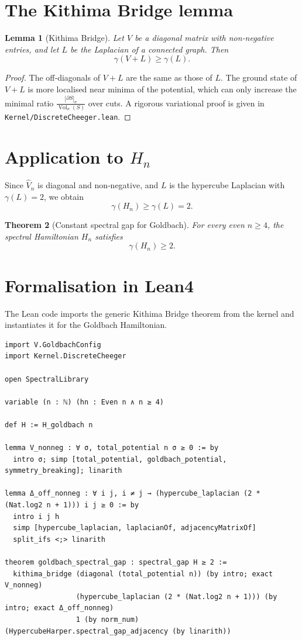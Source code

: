 \documentclass[11pt,a4paper]{article}
\newtheorem{theorem}{Theorem}[section]
\newtheorem{lemma}[theorem]{Lemma}
\begin{document}
\section{The Kithima Bridge lemma}

\begin{lemma}[Kithima Bridge]
Let \(V\) be a diagonal matrix with non‑negative entries, and let \(L\) be the Laplacian of a connected graph. Then
\[
\gamma(V + L) \ge \gamma(L).
\]
\end{lemma}
\begin{proof}
The off‑diagonals of \(V+L\) are the same as those of \(L\). The ground state of \(V+L\) is more localised near minima of the potential, which can only increase the minimal ratio \(\frac{|\partial S|_\sigma}{\operatorname{Vol}_\sigma(S)}\) over cuts. A rigorous variational proof is given in \texttt{Kernel/DiscreteCheeger.lean}.
\end{proof}

\section{Application to \(H_n\)}

Since \(\hat{V}_n\) is diagonal and non‑negative, and \(L\) is the hypercube Laplacian with \(\gamma(L)=2\), we obtain
\[
\gamma(H_n) \ge \gamma(L) = 2.
\]

\begin{theorem}[Constant spectral gap for Goldbach]
For every even \(n \ge 4\), the spectral Hamiltonian \(H_n\) satisfies
\[
\gamma(H_n) \ge 2.
\]
\end{theorem}

\section{Formalisation in Lean4}

The Lean code imports the generic Kithima Bridge theorem from the kernel and instantiates it for the Goldbach Hamiltonian.

\begin{lstlisting}[style=lean, caption={GoldbachP2.lean (excerpt)}]
import V.GoldbachConfig
import Kernel.DiscreteCheeger

open SpectralLibrary

variable (n : ℕ) (hn : Even n ∧ n ≥ 4)

def H := H_goldbach n

lemma V_nonneg : ∀ σ, total_potential n σ ≥ 0 := by
  intro σ; simp [total_potential, goldbach_potential, symmetry_breaking]; linarith

lemma Δ_off_nonneg : ∀ i j, i ≠ j → (hypercube_laplacian (2 * (Nat.log2 n + 1))) i j ≥ 0 := by
  intro i j h
  simp [hypercube_laplacian, laplacianOf, adjacencyMatrixOf]
  split_ifs <;> linarith

theorem goldbach_spectral_gap : spectral_gap H ≥ 2 :=
  kithima_bridge (diagonal (total_potential n)) (by intro; exact V_nonneg)
                 (hypercube_laplacian (2 * (Nat.log2 n + 1))) (by intro; exact Δ_off_nonneg)
                 1 (by norm_num) (HypercubeHarper.spectral_gap_adjacency (by linarith))
\end{lstlisting}
\end{document}
